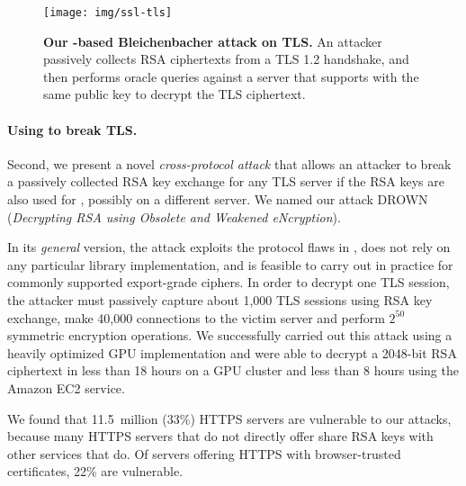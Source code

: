 \begin{figure}[t]
	\texttt{[image: img/ssl-tls]} 
	\caption{\textbf{Our \ssltwo-based Bleichenbacher attack on TLS.} An attacker passively collects RSA ciphertexts from a TLS 1.2 handshake, and then performs oracle queries against a server that supports \ssltwo with the same public key to decrypt the TLS ciphertext.}
	\label{fig:ssl-tls}
\end{figure}
\fi

\paragraph{Using \ssltwo to break TLS\@.}
Second, we present a novel \textit{cross-protocol attack} that allows an attacker to break a passively collected RSA key exchange for any TLS server if the RSA keys are also used for \ssltwo, possibly on a different server.
We named our attack DROWN (\emph{Decrypting RSA using Obsolete and Weakened eNcryption}).

In its \emph{general} version, the attack exploits the protocol flaws in \ssltwo, does not rely on any particular library implementation, and is feasible to carry out in practice for commonly supported export-grade ciphers.  In order to decrypt one TLS session, the attacker must passively capture about 1,000 TLS sessions using RSA key exchange, make 40,000 \ssltwo connections to the victim server and perform \begin{math} 2^{50} \end{math} symmetric encryption operations.  We successfully carried out this attack using a heavily optimized GPU implementation and were able to decrypt a 2048-bit RSA ciphertext in less than 18 hours on a GPU cluster and less than 8 hours using the Amazon EC2 service.  

We found that 11.5~million (33\%) HTTPS servers are vulnerable to our attacks, 
because many HTTPS servers that do not directly offer \ssltwo share
RSA keys with other services that do.   Of servers
offering HTTPS with browser-trusted certificates, 22\% are vulnerable.

